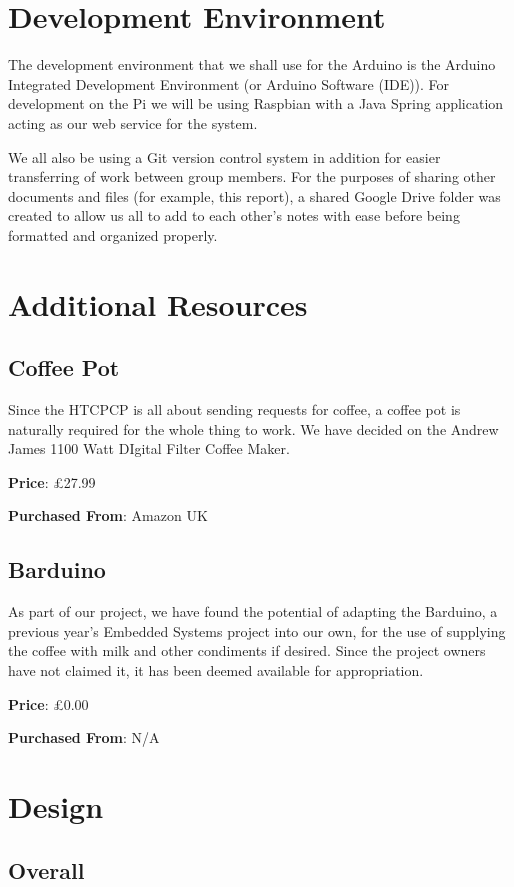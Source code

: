 \documentclass[12pt, a4paper]{article}
\begin{document}
\newpage

\section{Development Environment}
The development environment that we shall use for the Arduino is the Arduino
Integrated Development Environment (or Arduino Software (IDE)). For development
on the Pi we will be using Raspbian with a Java Spring application acting as our
web service for the system.

We all also be using a Git version control system in addition for easier
transferring of work between group members. For the purposes of sharing other
documents and files (for example, this report), a shared Google Drive folder was
created to allow us all to add to each other's notes with ease before being
formatted and organized properly.

\section{Additional Resources}
\subsection{Coffee Pot}
Since the HTCPCP is all about sending requests for coffee, a coffee pot is
naturally required for the whole thing to work. We have decided on the Andrew
James 1100 Watt DIgital Filter Coffee Maker.

\textbf{Price}: £27.99

\textbf{Purchased From}: Amazon UK
\subsection{Barduino}
As part of our project, we have found the potential of adapting the Barduino, a
previous year’s Embedded Systems project into our own, for the use of supplying
the coffee with milk and other condiments if desired. Since the project owners
have not claimed it, it has been deemed available for appropriation.

\textbf{Price}: £0.00

\textbf{Purchased From}: N/A

\newpage

\section{Design}
\subsection{Overall}
\end{document}
